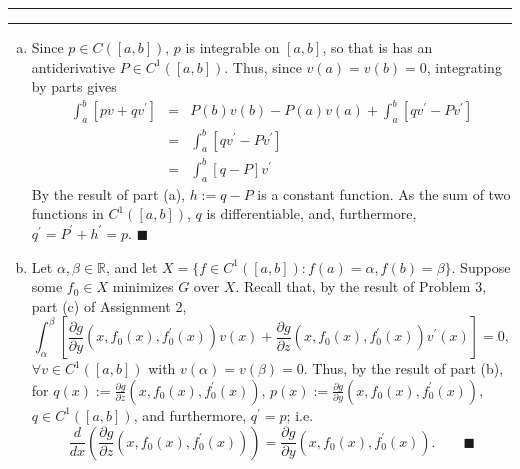 \documentclass[11pt]{article}
\newcounter{questionCounter}
\newcounter{partCounter}[questionCounter]
\newenvironment{question}[2][\arabic{questionCounter}]{%
    \setcounter{partCounter}{0}%
    \vspace{.25in} \hrule \vspace{0.5em}%
        \noindent{\bf #2}%
    \vspace{0.8em} \hrule \vspace{.10in}%
    \addtocounter{questionCounter}{1}%
}{}
\begin{document}
\begin{question}{Problem 2}
\begin{enumerate}[(a)]
\item Since $p \in C([a,b])$, $p$ is integrable on $[a,b]$, so that is has an
antiderivative $P \in C^1([a,b])$. Thus, since $v(a) = v(b) = 0$, integrating
by parts gives
\begin{eqnarray*}
\int_a^b [pv + qv^{\prime}]
 & = & P(b)v(b) - P(a)v(a) + \int_a^b [qv^{\prime} - Pv^{\prime}] \\
 & = & \int_a^b [qv^{\prime} - Pv^{\prime}] \\
 & = & \int_a^b \left[q - P\right]v^{\prime}
\end{eqnarray*}
By the result of part (a), $h := q - P$ is a constant function. As the
sum of two functions in $C^1([a,b])$, $q$ is differentiable, and,
furthermore, $q^{\prime} = P^{\prime} + h^{\prime} = p$. \qquad $\blacksquare$

\item Let $\alpha, \beta \in \mathbb{R}$, and let
$X = \{f \in C^1([a,b]) : f(a) = \alpha, f(b) = \beta\}$. Suppose some
$f_0 \in X$ minimizes $G$ over $X$. Recall that, by the result of
Problem 3, part (c) of Assignment 2,
\[\int_{\alpha}^{\beta} \left[
\frac{\partial g}{\partial y} (x,f_0(x),f^{\prime}_0(x))v(x)
 + \frac{\partial g}{\partial z} (x,f_0(x),f^{\prime}_0(x))v^{\prime}(x)
 \right]
 = 0,\]
$\forall v \in C^1([a,b])$ with $v(\alpha) = v(\beta) = 0$. Thus, by the
result of part (b), for
$q(x) := \frac{\partial g}{\partial z} (x,f_0(x),f_0^{\prime}(x))$,
$p(x) := \frac{\partial g}{\partial y} (x,f_0(x),f_0^{\prime}(x))$,
$q \in C^1([a,b])$, and furthermore, $q^\prime = p$; i.e.
\[\frac{d}{dx} \left( \frac{\partial g}{\partial z}
                                   (x,f_0(x),f_0^{\prime}(x)) \right)
 = \frac{\partial g}{\partial y} (x,f_0(x),f_0^{\prime}(x)).
   \qquad \blacksquare\]


\end{enumerate}
\end{question}
\end{document}
